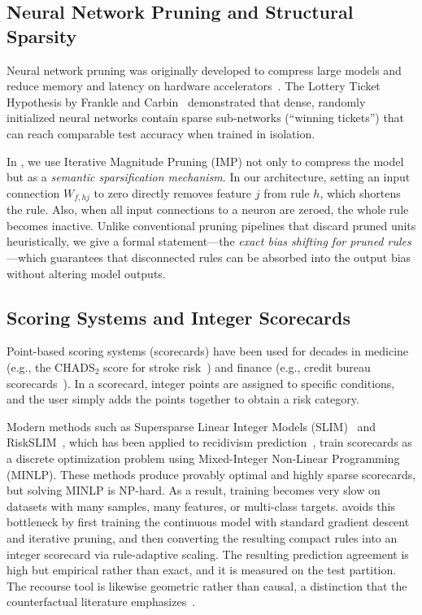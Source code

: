 \subsection{Neural Network Pruning and Structural Sparsity}
\label{subsec:related_pruning}

Neural network pruning was originally developed to compress large models and reduce memory and latency on hardware accelerators~\cite{han2015learning}. The Lottery Ticket Hypothesis by Frankle and Carbin~\cite{frankle2018lottery} demonstrated that dense, randomly initialized neural networks contain sparse sub-networks (``winning tickets'') that can reach comparable test accuracy when trained in isolation.

In \modelname{}, we use Iterative Magnitude Pruning (IMP) not only to compress the model but as a \emph{semantic sparsification mechanism}. In our architecture, setting an input connection $W_{f,hj}$ to zero directly removes feature $j$ from rule $h$, which shortens the rule. Also, when all input connections to a neuron are zeroed, the whole rule becomes inactive. Unlike conventional pruning pipelines that discard pruned units heuristically, we give a formal statement---the \emph{exact bias shifting for pruned rules}---which guarantees that disconnected rules can be absorbed into the output bias without altering model outputs.

\subsection{Scoring Systems and Integer Scorecards}
\label{subsec:related_scorecards}

Point-based scoring systems (scorecards) have been used for decades in medicine (e.g., the CHADS$_2$ score for stroke risk~\cite{gage2001validation}) and finance (e.g., credit bureau scorecards~\cite{hlongwane2024transparency}). In a scorecard, integer points are assigned to specific conditions, and the user simply adds the points together to obtain a risk category.

Modern methods such as Supersparse Linear Integer Models (SLIM)~\cite{ustun2016supersparse} and RiskSLIM~\cite{ustun2017optimized}, which has been applied to recidivism prediction~\cite{zeng2017interpretable}, train scorecards as a discrete optimization problem using Mixed-Integer Non-Linear Programming (MINLP). These methods produce provably optimal and highly sparse scorecards, but solving MINLP is NP-hard. As a result, training becomes very slow on datasets with many samples, many features, or multi-class targets. \modelname{} avoids this bottleneck by first training the continuous model with standard gradient descent and iterative pruning, and then converting the resulting compact rules into an integer scorecard via rule-adaptive scaling. The resulting prediction agreement is high but empirical rather than exact, and it is measured on the test partition. The recourse tool is likewise geometric rather than causal, a distinction that the counterfactual literature emphasizes~\cite{verma2024counterfactual}.

